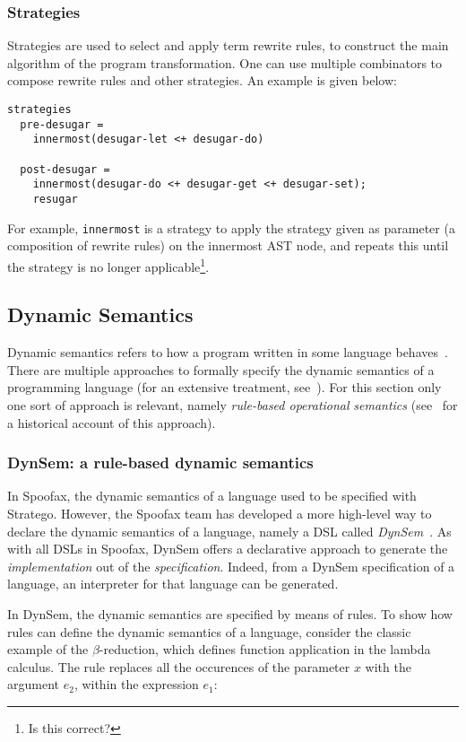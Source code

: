 \subsubsection{Strategies}
\label{sec:orgheadline5}
Strategies are used to select and apply term rewrite rules, to
construct the main algorithm of the program transformation. One can
use multiple combinators to compose rewrite rules and other
strategies. An example is given below:
\begin{verbatim}
strategies
  pre-desugar =
    innermost(desugar-let <+ desugar-do)

  post-desugar =
    innermost(desugar-do <+ desugar-get <+ desugar-set);
    resugar
\end{verbatim}
For example, \texttt{innermost} is a strategy to apply the strategy given as
parameter (a composition of rewrite rules) on the innermost AST node,
and repeats this until the strategy is no longer applicable\footnote{Is
this correct?}.
\subsection{Dynamic Semantics}
\label{sec-dynamic-semantics}
Dynamic semantics refers to how a program written in some language
behaves~\cite{Winskel93}. There are multiple approaches to
formally specify the dynamic semantics of a programming language (for
an extensive treatment, see~\cite{Winskel93}). For this section
only one sort of approach is relevant, namely \emph{rule-based operational}
\emph{semantics} (see~\cite{Plotkin04} for a historical account of this
approach).

\subsubsection{DynSem: a rule-based dynamic semantics}
\label{ssec-dynsem}
In Spoofax, the dynamic semantics of a language used to be specified
with Stratego. However, the Spoofax team has developed a more
high-level way to declare the dynamic semantics of a language, namely
a DSL called \emph{DynSem}~\cite{VerguNV15}. As with all DSLs in
Spoofax, DynSem offers a declarative approach to generate the
\emph{implementation} out of the \emph{specification}. Indeed, from a DynSem
specification of a language, an interpreter for that language can be
generated.

In DynSem, the dynamic semantics are specified by means of rules. To
show how rules can define the dynamic semantics of a language,
consider the classic example of the \(\beta\)-reduction, which defines
function application in the lambda calculus. The rule replaces all the
occurences of the parameter \(x\) with the argument \(e_2\), within the
expression \(e_1\):


